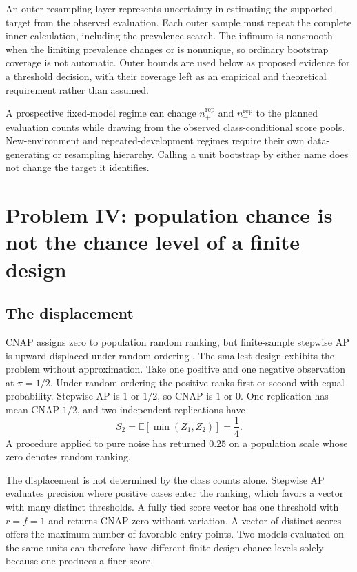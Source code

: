 \documentclass[11pt]{article}
\newcommand{\E}{\mathbb{E}}
\theoremstyle{remark}
\begin{document}
An outer resampling layer represents uncertainty in estimating the supported target from the observed evaluation. Each outer sample must repeat the complete inner calculation, including the prevalence search. The infimum is nonsmooth when the limiting prevalence changes or is nonunique, so ordinary bootstrap coverage is not automatic. Outer bounds are used below as proposed evidence for a threshold decision, with their coverage left as an empirical and theoretical requirement rather than assumed.

A prospective fixed-model regime can change $n_+^{\mathrm{rep}}$ and $n_-^{\mathrm{rep}}$ to the planned evaluation counts while drawing from the observed class-conditional score pools. New-environment and repeated-development regimes require their own data-generating or resampling hierarchy. Calling a unit bootstrap by either name does not change the target it identifies.

\section{Problem IV: population chance is not the chance level of a finite design}
\label{sec:calibration}

\subsection{The displacement}

CNAP assigns zero to population random ranking, but finite-sample stepwise AP is upward displaced under random ordering \cite{bestgen2015random}. The smallest design exhibits the problem without approximation. Take one positive and one negative observation at $\pi=1/2$. Under random ordering the positive ranks first or second with equal probability. Stepwise AP is $1$ or $1/2$, so CNAP is $1$ or $0$. One replication has mean CNAP $1/2$, and two independent replications have
\[
S_2
=
\E[\min(Z_1,Z_2)]
=
\frac14.
\]
A procedure applied to pure noise has returned $0.25$ on a population scale whose zero denotes random ranking.

The displacement is not determined by the class counts alone. Stepwise AP evaluates precision where positive cases enter the ranking, which favors a vector with many distinct thresholds. A fully tied score vector has one threshold with $r=f=1$ and returns CNAP zero without variation. A vector of distinct scores offers the maximum number of favorable entry points. Two models evaluated on the same units can therefore have different finite-design chance levels solely because one produces a finer score.
\end{document}
